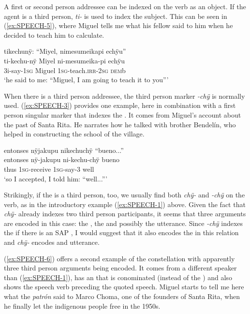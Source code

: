 
A first or second person addressee can be indexed on the verb as an object. If the agent is a third person, \textit{ti-} is used to index the subject. This can be seen in (\ref{ex:SPEECH-5}), where Miguel tells me what his fellow said to him when he decided to teach him to calculate.

\ea\label{ex:SPEECH-5}
\begingl
\glpreamble tikechunÿ: “Miyel, nimesumeikapi echÿu”\\
\gla ti-kechu-nÿ Miyel ni-mesumeika-pi echÿu\\
\glb 3i-say-1\textsc{sg} Miguel 1\textsc{sg}-teach.\textsc{irr}-2\textsc{sg} \textsc{dem}b\\
\glft ‘he said to me: “Miguel, I am going to teach it to you”’
\endgl
\trailingcitation{[mxx-p181027l-1.119]}
\xe

When there is a third person addressee, the third person marker \textit{-chÿ} is normally used. (\ref{ex:SPEECH-3}) provides one example, here in combination with a first person singular marker that indexes the . It comes from Miguel’s account about the past of Santa Rita. He narrates how he talked with brother Bendelín, who helped in constructing the school of the village.

\ea\label{ex:SPEECH-3}
\begingl
\glpreamble entonses nÿjakupu nikechuchÿ “bueno...”\\
\gla entonses nÿ-jakupu ni-kechu-chÿ bueno\\
\glb thus 1\textsc{sg}-receive 1\textsc{sg}-say-3 well\\
\glft ‘so I accepted, I told him: “well...”’
\endgl
\trailingcitation{[mxx-p110825l.113]}
\xe

Strikingly, if the  is a third person, too, we usually find both \textit{chÿ-} and \textit{-chÿ} on the verb, as in the introductory example (\ref{ex:SPEECH-1}) above. Given the fact that \textit{chÿ-} already indexes two third person participants, it seems that three arguments are encoded in this case: the , the  and possibly the utterance. Since \textit{-chÿ} indexes the  if there is an SAP , I would suggest that it also encodes the  in this relation and \textit{chÿ-} encodes  and utterance.

(\ref{ex:SPEECH-6}) offers a second example of the constellation with apparently three third person arguments being encoded. It comes from a different speaker than (\ref{ex:SPEECH-1}), has an  that is conominated (instead of the ) and also shows the speech verb preceding the quoted speech. Miguel starts to tell me here what the \textit{patrón} said to Marco Choma, one of the founders of Santa Rita, when he finally let the indigenous people free in the 1950s.

